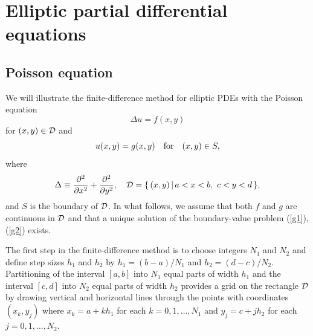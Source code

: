 %
%
%


\section{Elliptic partial differential equations}

\subsection{Poisson equation}

We will illustrate the finite-difference
method for elliptic PDEs with the Poisson equation
\begin{equation}
\Delta u = f(x,y)   \label{g1}
\end{equation}
for $(x,y)\in{\cal D}$ and
\begin{equation}
u(x,y) = g(x,y) \quad \hbox{for} \quad (x,y)\in S,   \label{g2}
\end{equation}
where
\[
\Delta\equiv\frac{{\partial}^{2}}{{\partial} x^{2}}+ \frac{{\partial}^{2}}{{\partial} y^{2}}, \quad
{\cal D}=\{\, (x,y)\, \vert \,  a<x<b, \ c<y<d \, \},
\]
and $S$ is the boundary of ${\cal D}$. In what follows, we assume that both
$f$ and $g$ are continuous
in ${\cal D}$ and that a unique solution of
the boundary-value problem (\ref{g1}), (\ref{g2}) exists.

\vskip 0.3cm
 
The first step in the finite-difference method is to choose integers $N_{1}$ and $N_{2}$ and define
step sizes $h_{1}$ and $h_{2}$ by $h_{1}=(b-a)/N_{1}$ and $h_{2}=(d-c)/N_{2}$. Partitioning of
the interval $[a, b]$ into $N_{1}$ equal parts of width $h_{1}$ and
the interval $[c, d]$ into $N_{2}$ equal parts of width $h_{2}$ provides a grid on the
rectangle ${\cal D}$ by drawing vertical and horizontal lines through the points with coordinates
$(x_{k}, y_{j})$ where $x_{k}=a+kh_{1}$ for each $k=0,1,\dots,N_{1}$ and
$y_{j}=c+jh_{2}$ for each $j=0,1,\dots,N_{2}$.
 
